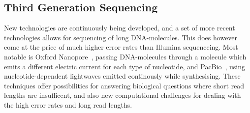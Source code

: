 \subsection{Third Generation Sequencing}
New technologies are continuously being developed, and a set of more recent technologies allows for sequencing of long DNA-molecules. This does however come at the price of much higher error rates than Illumina sequenceing. Most notable is Oxford Nanopore~\cite{nanopore}, passing DNA-molecules through a molecule which emits a different electric current for each type of nucleotide, and PacBio~\cite{pacbio}, using  nucleotide-dependent lightwaves emitted continously while synthesising.
These techniques offer possibilities for answering biological questions where short read lengths are insufficent, and also new computational challenges for dealing with the high error rates and long read lengths. 



